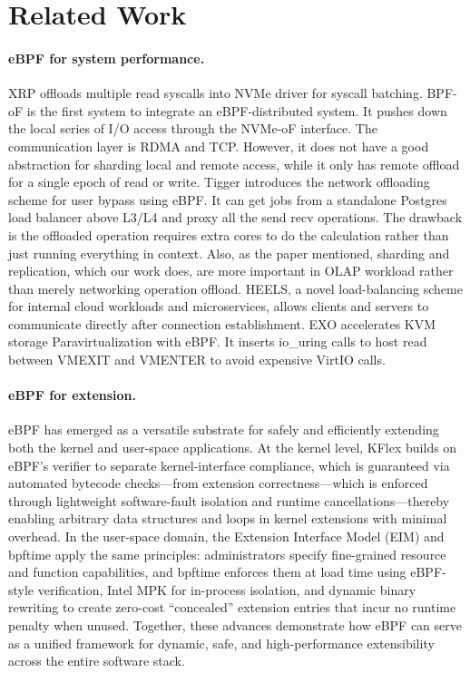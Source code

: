 \documentclass[sigconf,10pt]{acmart}
\begin{document}
\section{Related Work}\label{sec:related_work}

\paragraph{eBPF for system performance.} XRP\cite{Zhong22} offloads multiple read syscalls into NVMe driver for syscall batching. BPF-oF\cite{zarkadas2023bpf} is the first system to integrate an eBPF-distributed system. It pushes down the local series of I/O access through the NVMe-oF interface. The communication layer is RDMA and TCP. However, it does not have a good abstraction for sharding local and remote access, while it only has remote offload for a single epoch of read or write. Tigger\cite{butrovich23} introduces the network offloading scheme for user bypass using eBPF. It can get jobs from a standalone Postgres load balancer above L3/L4 and proxy all the send recv operations. The drawback is the offloaded operation requires extra cores to do the calculation rather than just running everything in context. Also, as the paper mentioned, sharding and replication, which our work does, are more important in OLAP workload rather than merely networking operation offload. HEELS\cite{yang2023heels}, a novel load-balancing scheme for internal cloud workloads and microservices, allows clients and servers to communicate directly after connection establishment. EXO\cite{exo} accelerates KVM storage Paravirtualization with eBPF. It inserts io\_uring calls to host read between VMEXIT and VMENTER to avoid expensive VirtIO calls.

\paragraph{eBPF for extension.} eBPF has emerged as a versatile substrate for safely and efficiently extending both the kernel and user-space applications. At the kernel level, KFlex\cite{kflex} builds on eBPF’s verifier to separate kernel-interface compliance, which is guaranteed via automated bytecode checks—from extension correctness—which is enforced through lightweight software-fault isolation and runtime cancellations—thereby enabling arbitrary data structures and loops in kernel extensions with minimal overhead. In the user-space domain, the Extension Interface Model (EIM) and bpftime apply the same principles: administrators specify fine-grained resource and function capabilities, and bpftime enforces them at load time using eBPF-style verification, Intel MPK for in-process isolation, and dynamic binary rewriting to create zero-cost “concealed” extension entries that incur no runtime penalty when unused. Together, these advances demonstrate how eBPF can serve as a unified framework for dynamic, safe, and high-performance extensibility across the entire software stack.
\end{document}
